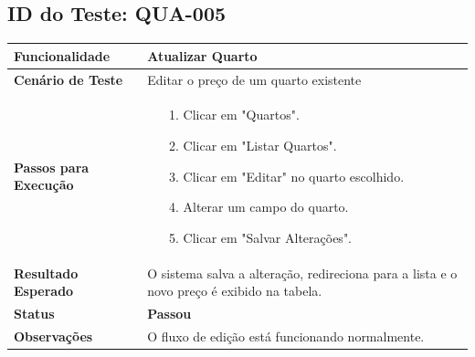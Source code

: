 \documentclass[
	12pt,				%
	openany,			%
	oneside,			%
	a4paper,			%
	english,			%
	french,				%
	spanish,			%
	brazil				%
	]{abntex2}
\begin{document}
\begin{apendicesenv}
\subsection*{ID do Teste: QUA-005}
\begin{tabular}{@{} p{5cm} p{11cm} @{}}
	\toprule
	\textbf{Funcionalidade} & Atualizar Quarto \\
	\midrule
	\textbf{Cenário de Teste} & Editar o preço de um quarto existente \\
	\midrule
	\textbf{Passos para Execução} &
	\begin{itemize} \itemsep0em 
		\item[1.] Clicar em "Quartos".
		\item[2.] Clicar em "Listar Quartos".
		\item[3.] Clicar em "Editar" no quarto escolhido.
		\item[4.] Alterar um campo do quarto.
		\item[5.] Clicar em "Salvar Alterações".
	\end{itemize} \\
	\midrule
	\textbf{Resultado Esperado} & O sistema salva a alteração, redireciona para a lista e o novo preço é exibido na tabela. \\
	\midrule
	\textbf{Status} & \textbf{Passou} \\
	\midrule
	\textbf{Observações} & O fluxo de edição está funcionando normalmente. \\
	\bottomrule
\end{tabular}
\vspace{1cm}


\end{apendicesenv}
\end{document}

